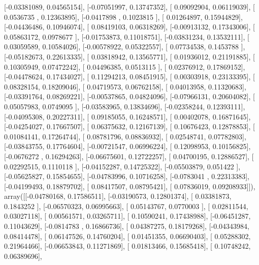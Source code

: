 \documentclass{article}
\begin{document}
       [-0.03381089,  0.04565154],
       [-0.07051997,  0.13747352],
       [ 0.09092904,  0.06119039],
       [ 0.0536735 ,  0.12363895],
       [-0.0417898 ,  0.1023815 ],
       [ 0.01264897,  0.15944829],
       [-0.04436486,  0.10946074],
       [ 0.08419103,  0.06318269],
       [-0.00913132,  0.17343006],
       [ 0.05863172,  0.0978677 ],
       [-0.01753873,  0.11018751],
       [-0.03831234,  0.13532111],
       [ 0.03059589,  0.10584026],
       [-0.00578922,  0.05322557],
       [ 0.07734538,  0.1453788 ],
       [-0.05182673,  0.22613335],
       [ 0.03818942,  0.13565771],
       [ 0.01936012,  0.21191885],
       [ 0.10305949,  0.07472242],
       [ 0.04496385,  0.0513115 ],
       [ 0.02376912,  0.17869152],
       [-0.04478624,  0.17434027],
       [ 0.11294213,  0.08451915],
       [ 0.00303918,  0.23133395],
       [ 0.08328154,  0.18209046],
       [ 0.04719573,  0.06762158],
       [ 0.04013958,  0.11320683],
       [-0.03391764,  0.08269221],
       [-0.00537865,  0.04824096],
       [-0.07966131,  0.20604082],
       [ 0.05057983,  0.0749095 ],
       [-0.03583965,  0.13834696],
       [-0.02358244,  0.12393111],
       [-0.04095308,  0.20227311],
       [ 0.09185055,  0.16248571],
       [ 0.00402078,  0.16871645],
       [-0.04254027,  0.17667507],
       [ 0.06375632,  0.12167139],
       [ 0.10676423,  0.12878853],
       [ 0.01084141,  0.17264744],
       [ 0.08781796,  0.08836932],
       [ 0.02548741,  0.07782803],
       [-0.03843755,  0.17764604],
       [-0.00721547,  0.06996224],
       [ 0.12098953,  0.10156825],
       [-0.0676272 ,  0.16294263],
       [-0.06675601,  0.12722257],
       [ 0.04700195,  0.12886527],
       [ 0.02292515,  0.1110118 ],
       [-0.04152287,  0.14725322],
       [-0.05503879,  0.051422  ],
       [-0.05625827,  0.15854655],
       [-0.04783996,  0.10716258],
       [-0.0783041 ,  0.22313383],
       [-0.04199493,  0.18879702],
       [ 0.08417507,  0.08795421],
       [ 0.07836019,  0.09208933]]), array([[-0.04780168,  0.17586511],
       [-0.03190573,  0.12801374],
       [ 0.03381873,  0.1843252 ],
       [-0.06570323,  0.06995663],
       [ 0.05143767,  0.0770003 ],
       [ 0.02811544,  0.03027118],
       [ 0.00561571,  0.03265711],
       [ 0.10590241,  0.17438988],
       [-0.06451287,  0.11043629],
       [-0.0814783 ,  0.16866736],
       [ 0.04387275,  0.18179268],
       [-0.04343984,  0.08414478],
       [ 0.06147526,  0.14760204],
       [ 0.01451355,  0.06690403],
       [ 0.05288302,  0.21964466],
       [-0.06653843,  0.11271869],
       [ 0.01813466,  0.15685418],
       [ 0.10748242,  0.06389696],
\end{document}
